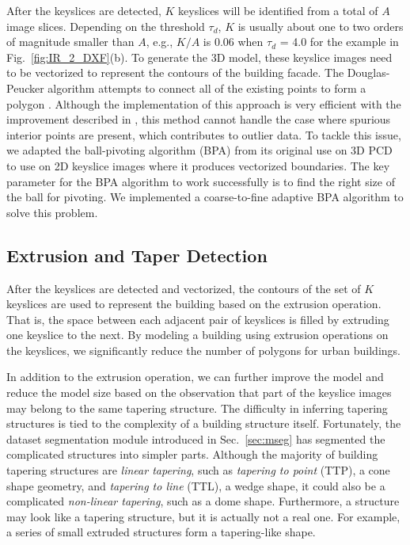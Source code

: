 \documentclass[10pt, conference, compsocconf]{IEEEtran}
\newcommand{\Sec}[1]{Sec.~\ref{sec:#1}}
\newcommand{\Figb}[1]{Fig.~\ref{fig:#1}(b)}
\begin{document}
After the keyslices are detected, $K$ keyslices will be identified
from a total of $A$ image slices.
Depending on the threshold $\tau_{d}$, $K$ is usually about one to two
orders of magnitude smaller than $A$, e.g., $K/A$ is 0.06 when
$\tau_d$ = 4.0 for the example in \Figb{IR_2_DXF}.
To generate the 3D model, these keyslice images need to be vectorized to
represent the contours of the building facade.
The Douglas-Peucker algorithm attempts to connect all of the existing points
to form a polygon \cite{DP_DP}.
Although the implementation of this approach is very efficient with the
improvement described in \cite{DP_HS}, this method cannot handle the case
where spurious interior points are present, which contributes to outlier data.
To tackle this issue, we adapted the ball-pivoting algorithm (BPA)
\cite{BPA_BMRS} from its original use on 3D PCD to use on
2D keyslice images where it produces vectorized boundaries.
The key parameter for the BPA algorithm to work successfully is to
find the right size of the ball for pivoting.
We implemented a coarse-to-fine adaptive BPA algorithm to solve this problem.

\subsection{Extrusion and Taper Detection}
\label{sec:tsd}

After the keyslices are detected and vectorized, the contours of
the set of $K$ keyslices are used to represent the building based
on the extrusion operation.
That is, the space between each adjacent pair of keyslices
is filled by extruding one keyslice to the next.
By modeling a building using extrusion operations on the keyslices,
we significantly reduce the number of polygons for urban buildings.

In addition to the extrusion operation, we can further improve
the model and reduce the model size based on the observation
that part of the keyslice images may belong to the same tapering structure.
The difficulty in inferring tapering structures is tied to
the complexity of a building structure itself.
Fortunately, the dataset segmentation module introduced in \Sec{mseg}
has segmented the complicated structures into simpler parts.
Although the majority of building tapering structures are {\it linear tapering},
such as {\it tapering to point} (TTP), a cone shape geometry,
and {\it tapering to line} (TTL), a wedge shape,
it could also be a complicated {\it non-linear tapering},
such as a dome shape.
Furthermore, a structure may look like a tapering structure,
but it is actually not a real one.
For example, a series of small extruded structures
form a tapering-like shape.
\end{document}
